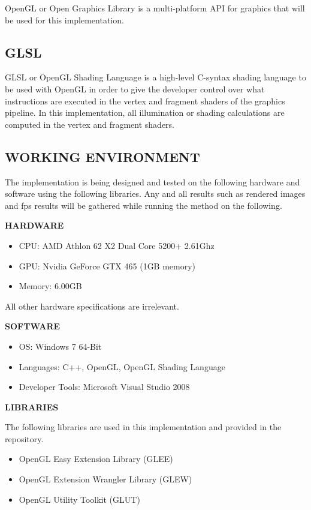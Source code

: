 OpenGL or Open Graphics Library is a multi-platform API for graphics that will be used for this implementation.  

\subsection{GLSL}

GLSL or OpenGL Shading Language is a high-level C-syntax shading language to be used with OpenGL in order to give the developer control over what instructions are executed in the vertex and fragment shaders of the graphics pipeline.  In this implementation, all illumination or shading calculations are computed in the vertex and fragment shaders.

\subsection{WORKING ENVIRONMENT}

The implementation is being designed and tested on the following hardware and software using the following libraries.  Any and all results such as rendered images and fps results will be gathered while running the method on the following.

\vspace{10 mm}

\textbf{HARDWARE}
\begin{itemize}
\item CPU: AMD Athlon 62 X2 Dual Core 5200+ 2.61Ghz
\item GPU: Nvidia GeForce GTX 465 (1GB memory)
\item Memory: 6.00GB
\end{itemize}

All other hardware specifications are irrelevant.

\vspace{10 mm}

\textbf{SOFTWARE}
\begin{itemize}
\item OS: Windows 7 64-Bit
\item Languages: C++, OpenGL, OpenGL Shading Language
\item Developer Tools: Microsoft Visual Studio 2008
\end{itemize}

\vspace{10 mm}

\textbf{LIBRARIES}

\vspace{1 mm}

The following libraries are used in this implementation and provided in the repository.

\begin{itemize}
\item OpenGL Easy Extension Library (GLEE)
\item OpenGL Extension Wrangler Library (GLEW)
\item OpenGL Utility Toolkit (GLUT)
\end{itemize}

